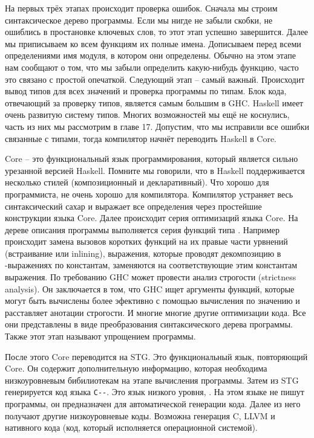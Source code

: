 На первых трёх этапах происходит проверка ошибок. 
Сначала мы строим синтаксическое дерево программы. 
Если мы нигде не забыли скобки, не ошиблись в простановке 
ключевых слов, то этот этап успешно завершится. 
Далее мы приписываем ко всем функциям их полные имена.
Дописываем перед всеми определениями имя модуля, в котором они
определены. Обычно на этом этапе нам сообщают о том, что
мы забыли определить какую-нибудь функцию, часто это связано
с простой опечаткой. Следующий этап -- самый важный. 
Происходит вывод типов для всех значений и проверка
программы по типам. Блок кода, отвечающий за проверку типов,
является самым большим в GHC. Haskell имеет очень 
развитую систему типов. Многих возможностей мы ещё 
не коснулись, часть из них мы рассмотрим в главе 17.
Допустим, что мы исправили все ошибки связанные с типами,
тогда компилятор начнёт переводить Haskell в Core.

Core -- это функциональный язык программирования, который 
является сильно урезанной версией Haskell. Помните мы говорили, что 
в Haskell поддерживается несколько стилей (композиционный
и декларативный). Что хорошо для программиста, не очень хорошо 
для компилятора. Компилятор устраняет весь синтаксический сахар
и выражает все определения через простейшие конструкции языка Core.
Далее происходит серия оптимизаций языка Core. На дереве
описания программы выполняется серия функций типа  \mbox{}.
Например происходит замена вызовов коротких функций на 
их правые части урвнений (встраивание или inlining), 
выражения, которые проводят декомпозицию в -выражениях 
по константам, заменяются на соответствующие этим константам 
выражения. По требованию GHC может провести анализ строгости
(strictness analysis). Он заключается в том, что GHC
ищет аргументы функций, которые могут быть вычислены 
более эфективно с помощью вычисления по значению и
расставляет анотации строгости. И многие многие другие
оптимизации кода. Все они представлены в виде преобразования
синтаксического дерева программы. Также этот этап называют
упрощением программы. 

После этого Core переводится на STG. Это функциональный
язык, повторяющий Core. Он содержит дополнительную информацию,
которая необходима низкоуровневым бибилиотекам на этапе 
вычисления программы. Затем из STG генерируется код
языка \verb!C--!. Это язык низкого уровня, .
На этом языке не пишут программы, он предназначен для 
автоматической генерации кода. Далее из него получают
другие низкоуровневые коды. Возможна генерация C, LLVM
и нативного кода (код, который исполняется операционной системой). 

